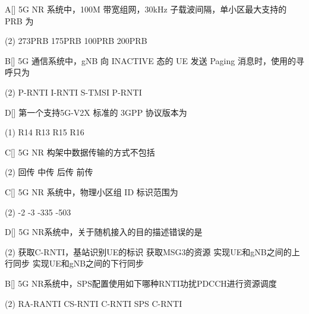 \begin{choice}{A}[]
    5G NR 系统中，100M 带宽组网，30kHz 子载波间隔，单小区最大支持的 PRB 为
    \begin{tasks}(2)
        \task 273PRB
        \task 175PRB
        \task 100PRB
        \task 200PRB
    \end{tasks}
\end{choice}

\begin{choice}{B}[]
    5G 通信系统中，gNB 向 INACTIVE 态的 UE 发送 Paging 消息时，使用的寻呼只为
    \begin{tasks}(2)
        \task P-RNTI
        \task I-RNTI
        \task S-TMSI
        \task P-RNTI
    \end{tasks}
\end{choice}


\begin{choice}{D}[]
    第一个支持5G-V2X 标准的 3GPP 协议版本为
    \begin{tasks}(1)
        \task  R14
        \task  R13
        \task R15
        \task R16
    \end{tasks}
\end{choice}


\begin{choice}{C}[]
    5G NR 构架中数据传输的方式不包括
    \begin{tasks}(2)
        \task 回传
        \task 中传
        \task 后传
        \task 前传
    \end{tasks}
\end{choice}



\begin{choice}{C}[]
    5G NR 系统中，物理小区组 ID 标识范围为
    \begin{tasks}(2)
        -2
        -3
        -335
        -503
    \end{tasks}
\end{choice}




\begin{choice}{D}[]
    5G NR系统中，关于随机接入的目的描述错误的是
    \begin{tasks}(2)
        \task 获取C-RNTI，基站识别UE的标识
        \task 获取MSG3的资源
        \task 实现UE和gNB之间的上行同步
        \task 实现UE和gNB之间的下行同步
    \end{tasks}
\end{choice}


\begin{choice}{B}[]
    5G NR系统中，SPS配置使用如下哪种RNTI功扰PDCCH进行资源调度
    \begin{tasks}(2)
        \task RA-RANTI
        \task CS-RNTI
        \task  C-RNTI
        \task SPS C-RNTI
    \end{tasks}
\end{choice}


